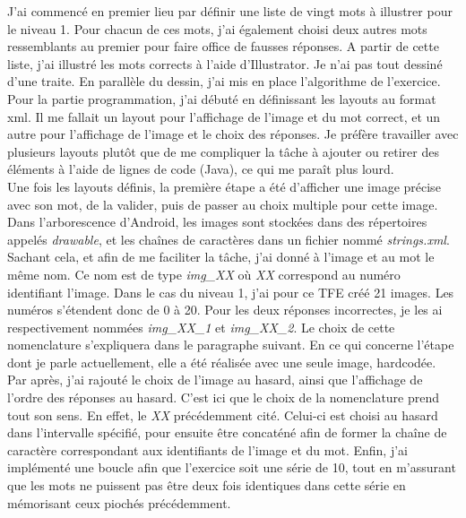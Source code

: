 J'ai commencé en premier lieu par définir une liste de vingt mots à illustrer pour le niveau 1. Pour chacun de ces mots, j'ai également choisi deux autres mots ressemblants au premier pour faire office de fausses réponses. A partir de cette liste, j'ai illustré les mots corrects à l'aide d'Illustrator. Je n'ai pas tout dessiné d'une traite. En parallèle du dessin, j'ai mis en place l'algorithme de l'exercice.\\

Pour la partie programmation, j'ai débuté en définissant les layouts au format xml. Il me fallait un layout pour l'affichage de l'image et du mot correct, et un autre pour l'affichage de l'image et le choix des réponses. Je préfère travailler avec plusieurs layouts plutôt que de me compliquer la tâche à ajouter ou retirer des éléments à l'aide de lignes de code (Java), ce qui me paraît plus lourd.\\

 Une fois les layouts définis, la première étape a été d'afficher une image précise avec son mot, de la valider, puis de passer au choix multiple pour cette image. Dans l'arborescence d'Android, les images sont stockées dans des répertoires appelés \textit{drawable}, et les chaînes de caractères dans un fichier nommé \textit{strings.xml}. Sachant cela, et afin de me faciliter la tâche, j'ai donné à l'image et au mot le même nom. Ce nom est de type \textit{img\_XX} où \textit{XX} correspond au numéro identifiant l'image. Dans le cas du niveau 1, j'ai pour ce TFE créé 21 images. Les numéros s'étendent donc de 0 à 20. Pour les deux réponses incorrectes, je les ai respectivement nommées \textit{img\_XX\_1} et \textit{img\_XX\_2}. Le choix de cette nomenclature s'expliquera dans le paragraphe suivant. En ce qui concerne l'étape dont je parle actuellement, elle a été réalisée avec une seule image, hardcodée.\\
 
Par après, j'ai rajouté le choix de l'image au hasard, ainsi que l'affichage de l'ordre des réponses au hasard. C'est ici que le choix de la nomenclature prend tout son sens. En effet, le \textit{XX} précédemment cité. Celui-ci est choisi au hasard dans l'intervalle spécifié, pour ensuite être concaténé afin de former la chaîne de caractère correspondant aux identifiants de l'image et du mot. Enfin, j'ai implémenté une boucle afin que l'exercice soit une série de 10, tout en m'assurant que les mots ne puissent pas être deux fois identiques dans cette série en mémorisant ceux piochés précédemment.\\

